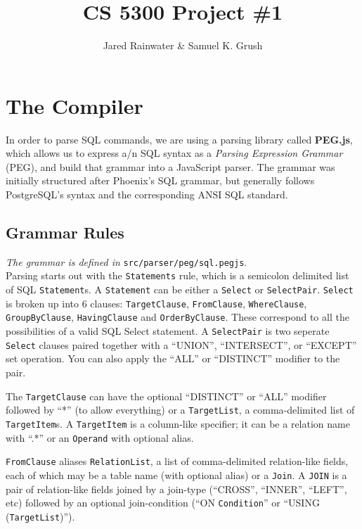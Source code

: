 \documentclass{article}
\title{CS 5300 Project \#1}
\author{Jared Rainwater \& Samuel K. Grush}
\begin{document}
\maketitle

\section{The Compiler}

In order to parse SQL commands, we are using a parsing library called \textbf{PEG.js},
which allows us to express a/n SQL syntax as a \emph{Parsing Expression Grammar} (PEG),
and build that grammar into a JavaScript parser.
The grammar was initially structured after Phoenix's SQL grammar,
but generally follows PostgreSQL's syntax and the corresponding ANSI SQL standard.

\subsection{Grammar Rules}

\emph{The grammar is defined in} \verb|src/parser/peg/sql.pegjs|. \\

Parsing starts out with the \verb|Statements| rule, which is a semicolon
delimited list of SQL \verb|Statement|s.
A \verb|Statement| can be either a \verb|Select| or \verb|SelectPair|.
\verb|Select| is broken up into 6 clauses: \verb|TargetClause|, \verb|FromClause|,
\verb|WhereClause|, \verb|GroupByClause|, \verb|HavingClause| and \verb|OrderByClause|.
These correspond to all the possibilities of a valid SQL Select statement.
A \verb|SelectPair| is two seperate \verb|Select| clauses paired together with a
``UNION'', ``INTERSECT'', or ``EXCEPT'' set operation.
You can also apply the ``ALL'' or ``DISTINCT'' modifier to the pair.

The \verb|TargetClause| can have the optional ``DISTINCT'' or ``ALL'' modifier
followed by ``*'' (to allow everything) or a \verb|TargetList|, a
comma-delimited list of \verb|TargetItem|s.
A \verb|TargetItem| is a column-like specifier; it can be a relation name with ``.*''
or an \verb|Operand| with optional alias.

\verb|FromClause| aliases \verb|RelationList|, a list of comma-delimited
relation-like fields, each of which may be a table name (with optional alias)
or a \verb|Join|. A \verb|JOIN| is a pair of relation-like fields joined by
a join-type (``CROSS'', ``INNER'', ``LEFT'', etc) followed by an optional
join-condition (``ON \verb|Condition|'' or ``USING (\verb|TargetList|)'').
\end{document}
